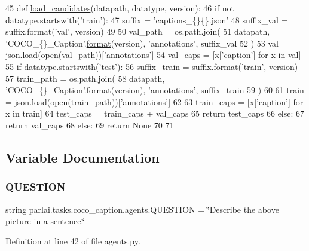 \begin{DoxyCode}
45 \textcolor{keyword}{def }\hyperlink{namespaceparlai_1_1tasks_1_1coco__caption_1_1agents_aa190162d0e36e1c93fc224b8a049f0cf}{load\_candidates}(datapath, datatype, version):
46     \textcolor{keywordflow}{if} \textcolor{keywordflow}{not} datatype.startswith(\textcolor{stringliteral}{'train'}):
47         suffix = \textcolor{stringliteral}{'captions\_\{\}\{\}.json'}
48         suffix\_val = suffix.format(\textcolor{stringliteral}{'val'}, version)
49 
50         val\_path = os.path.join(
51             datapath, \textcolor{stringliteral}{'COCO\_\{\}\_Caption'}.\hyperlink{namespaceparlai_1_1chat__service_1_1services_1_1messenger_1_1shared__utils_a32e2e2022b824fbaf80c747160b52a76}{format}(version), \textcolor{stringliteral}{'annotations'}, suffix\_val
52         )
53         val = json.load(open(val\_path))[\textcolor{stringliteral}{'annotations'}]
54         val\_caps = [x[\textcolor{stringliteral}{'caption'}] \textcolor{keywordflow}{for} x \textcolor{keywordflow}{in} val]
55         \textcolor{keywordflow}{if} datatype.startswith(\textcolor{stringliteral}{'test'}):
56             suffix\_train = suffix.format(\textcolor{stringliteral}{'train'}, version)
57             train\_path = os.path.join(
58                 datapath, \textcolor{stringliteral}{'COCO\_\{\}\_Caption'}.\hyperlink{namespaceparlai_1_1chat__service_1_1services_1_1messenger_1_1shared__utils_a32e2e2022b824fbaf80c747160b52a76}{format}(version), \textcolor{stringliteral}{'annotations'}, suffix\_train
59             )
60 
61             train = json.load(open(train\_path))[\textcolor{stringliteral}{'annotations'}]
62 
63             train\_caps = [x[\textcolor{stringliteral}{'caption'}] \textcolor{keywordflow}{for} x \textcolor{keywordflow}{in} train]
64             test\_caps = train\_caps + val\_caps
65             \textcolor{keywordflow}{return} test\_caps
66         \textcolor{keywordflow}{else}:
67             \textcolor{keywordflow}{return} val\_caps
68     \textcolor{keywordflow}{else}:
69         \textcolor{keywordflow}{return} \textcolor{keywordtype}{None}
70 
71 
\end{DoxyCode}


\subsection{Variable Documentation}
\mbox{\label{namespaceparlai_1_1tasks_1_1coco__caption_1_1agents_a4e989be739e8abe5d76058add98dd9cf}} 
\subsubsection{\texorpdfstring{Q\+U\+E\+S\+T\+I\+ON}{QUESTION}}
{\footnotesize\ttfamily string parlai.\+tasks.\+coco\+\_\+caption.\+agents.\+Q\+U\+E\+S\+T\+I\+ON = \char`\"{}Describe the above picture in a sentence.\char`\"{}}



Definition at line 42 of file agents.\+py.

